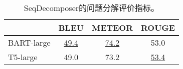 \begin{table}[htbp]
    \centering
    \caption{SeqDecomposer的问题分解评价指标。}
    \begin{tabular}{lccc}
    \hline
    & BLEU & METEOR & ROUGE \\
    \hline
    BART-large & \underline{49.4} & \underline{74.2} & 53.0 \\
    T5-large & 49.0 & 73.2 & \underline{53.4} \\
    \hline
    \end{tabular}
    \label{tab:5-2}
\end{table}
